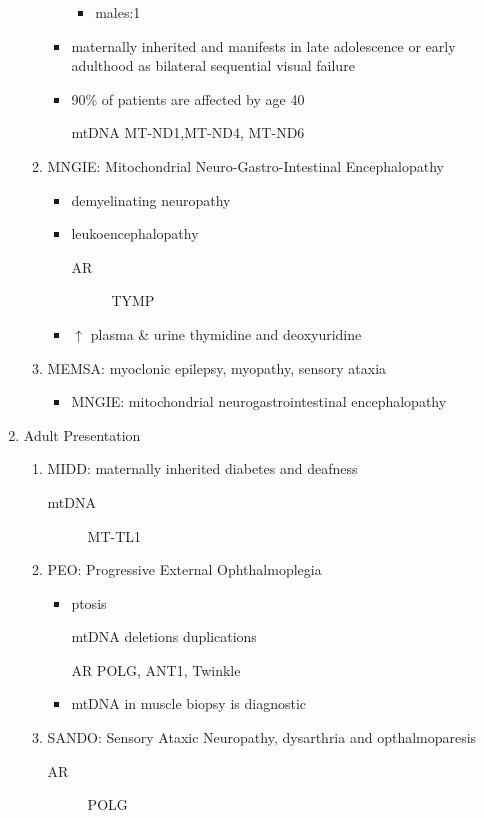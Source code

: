\documentclass{scrartcl}
\begin{document}
\begin{enumerate}
\begin{enumerate}
\begin{itemize}
\begin{itemize}
\item males:1
\end{itemize}
\item maternally inherited and manifests in late adolescence or early
adulthood as bilateral sequential visual failure
\item 90\% of patients are affected by age 40
\item[{mtDNA}] MT-ND1,MT-ND4, MT-ND6
\end{itemize}
\item MNGIE: Mitochondrial Neuro-Gastro-Intestinal Encephalopathy
\label{sec:orgf6308bc}
\begin{itemize}
\item demyelinating neuropathy
\item leukoencephalopathy
\begin{description}
\item[{AR}] TYMP
\end{description}
\item \(\uparrow\) plasma \& urine thymidine and deoxyuridine
\end{itemize}
\item MEMSA: myoclonic epilepsy, myopathy, sensory ataxia
\label{sec:org60615e8}
\begin{itemize}
\item MNGIE: mitochondrial neurogastrointestinal encephalopathy
\end{itemize}
\end{enumerate}

\item Adult Presentation
\label{sec:orga640146}
\begin{enumerate}
\item MIDD: maternally inherited diabetes and deafness
\label{sec:orga8eb3a8}
\begin{description}
\item[{mtDNA}] MT-TL1
\end{description}
\item PEO: Progressive External Ophthalmoplegia
\label{sec:org14b4016}
\begin{itemize}
\item ptosis
\item[{mtDNA}] deletions \textpm{} duplications
\item[{AR}] POLG, ANT1, Twinkle
\item mtDNA in muscle biopsy is diagnostic
\end{itemize}
\item SANDO: Sensory Ataxic Neuropathy, dysarthria and opthalmoparesis
\label{sec:org26e8ff1}
\begin{description}
\item[{AR}] POLG
\end{description}
\end{enumerate}
\end{enumerate}
\end{document}

